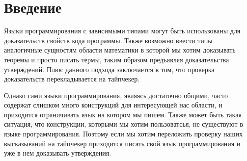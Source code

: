 \documentclass{spbau-diploma}
\begin{document}
\maketitle
\tableofcontents
\section*{Введение}
Языки программирования с зависимыми типами могут быть использованы для доказательств свойств кода программы. Также возможно ввести типы аналогичные сущностям области математики в которой мы хотим доказывать теоремы и просто писать термы, таким образом предъявляя доказательства утверждений. Плюс данного подхода заключается в том, что проверка доказательств перекладывается на тайпчекер.

Однако сами языки программирования, являясь достаточно общими, часто содержат слишком много конструкций для интересующей нас области, и приходится ограничивать язык на котором мы пишем. Также может быть такая ситуация, что конструкции, которыми мы хотим пользоватсья, не существуют в языке программирования. Поэтому если мы хотим переложить проверку наших высказываний на тайпчекер приходится писать свой язык программирования и уже в нем доказывать утверждения.
\end{document}
